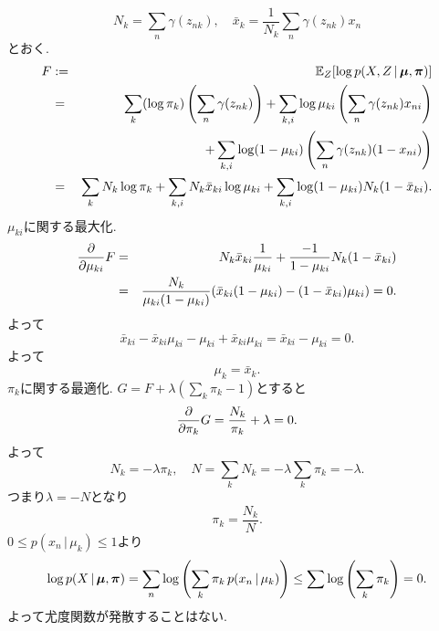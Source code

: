 $$
N_k=\sum_n \gamma(z_{nk}), \quad \bar{x}_k = \frac{1}{N_k}\sum_n \gamma(z_{nk})x_n
$$
とおく.
\begin{eqnarray*}
F
 &:=& \mathbb{E}_Z[\log p(X,Z\,|\,\bm{\mu},\bm{\pi})]\\
 &=& \sum_k (\log \pi_k)\left(\sum_n \gamma(z_{nk})\right)+\sum_{k,i} \log \mu_{ki}\left(\sum_n \gamma(z_{nk})x_{ni}\right)\\
 &&+ \sum_{k,i} \log (1-\mu_{ki})\left(\sum_n \gamma(z_{nk})(1-x_{ni})\right)\\
 &=& \sum_k N_k \log \pi_k + \sum_{k,i} N_k \bar{x}_{ki} \log \mu_{ki}
   + \sum_{k,i} \log (1-\mu_{ki}) N_k(1-\bar{x}_{ki}).
\end{eqnarray*}
$\mu_{ki}$に関する最大化.
\begin{eqnarray*}
\frac{\partial}{\partial \mu_{ki}}F
 &=& N_k \bar{x}_{ki} \frac{1}{\mu_{ki}}+\frac{-1}{1-\mu_{ki}} N_k (1-\bar{x}_{ki})
 \\
 &=& \frac{N_{k}}{\mu_{ki}(1-\mu_{ki})}(\bar{x}_{ki}(1-\mu_{ki})-(1-\bar{x}_{ki})\mu_{ki}) = 0.
\end{eqnarray*}
よって
$$
\bar{x}_{ki}-\bar{x}_{ki} \mu_{ki} - \mu_{ki}+\bar{x}_{ki} \mu_{ki}=\bar{x}_{ki}- \mu_{ki} = 0.
$$
よって
$$
\mu_k = \bar{x}_k.
$$
$\pi_k$に関する最適化.
$G=F+\lambda(\sum_k \pi_k-1)$とすると
$$
\frac{\partial}{\partial \pi_k}G = \frac{N_k}{\pi_k}+\lambda=0.
$$
よって
$$
N_k=-\lambda \pi_k, \quad N=\sum_k N_k = -\lambda \sum_k \pi_k = -\lambda.
$$
つまり$\lambda=-N$となり
$$
\pi_k=\frac{N_k}{N}.
$$
$0 \le p(x_n\,|\,\mu_k) \le 1$より
$$
\log p(X\,|\,\bm{\mu},\bm{\pi})=\sum_n \log \left(\sum_k \pi_k\, p(x_n\,|\,\mu_k)\right) \le \sum \log \left(\sum_k \pi_k\right)=0.
$$
よって尤度関数が発散することはない.

